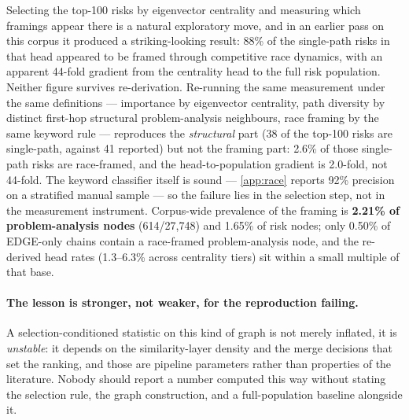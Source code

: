 \documentclass[10pt,twocolumn,letterpaper]{article}
\begin{document}
Selecting the top-100 risks by eigenvector centrality and measuring which framings
appear there is a natural exploratory move, and in an earlier pass on this corpus
it produced a striking-looking result: 88\% of the single-path risks in that head
appeared to be framed through competitive race dynamics, with an apparent
44-fold gradient from the centrality head to the full risk population. Neither
figure survives re-derivation. Re-running the same measurement under the same
definitions --- importance by eigenvector centrality, path diversity by distinct
first-hop structural problem-analysis neighbours, race framing by the same
keyword rule --- reproduces the \emph{structural} part (38 of the top-100 risks
are single-path, against 41 reported) but not the framing part: 2.6\% of those
single-path risks are race-framed, and the head-to-population gradient is
2.0-fold, not 44-fold. The keyword classifier itself is sound ---
\cref{app:race} reports 92\% precision on a stratified manual sample --- so the
failure lies in the selection step, not in the measurement instrument.
Corpus-wide prevalence of the framing is \textbf{2.21\% of problem-analysis
nodes} (614/27{,}748) and 1.65\% of risk nodes; only 0.50\% of EDGE-only chains
contain a race-framed problem-analysis node, and the re-derived head rates
(1.3--6.3\% across centrality tiers) sit within a small multiple of that base.

\paragraph{The lesson is stronger, not weaker, for the reproduction failing.} A
selection-conditioned statistic on this kind of graph is not merely inflated, it
is \emph{unstable}: it depends on the similarity-layer density and the merge
decisions that set the ranking, and those are pipeline parameters rather than
properties of the literature. Nobody should report a number computed this way
without stating the selection rule, the graph construction, and a full-population
baseline alongside it.
\end{document}
